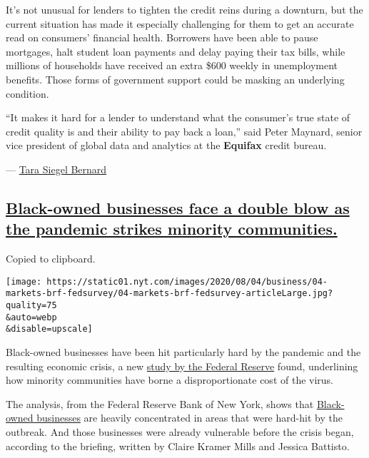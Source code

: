 It's not unusual for lenders to tighten the credit reins during a
downturn, but the current situation has made it especially challenging
for them to get an accurate read on consumers' financial health.
Borrowers have been able to pause mortgages, halt student loan payments
and delay paying their tax bills, while millions of households have
received an extra \$600 weekly in unemployment benefits. Those forms of
government support could be masking an underlying condition.

``It makes it hard for a lender to understand what the consumer's true
state of credit quality is and their ability to pay back a loan,'' said
Peter Maynard, senior vice president of global data and analytics at the
\textbf{Equifax} credit bureau.

--- \href{https://www.nytimes.com/by/tara-siegel-bernard}{Tara Siegel
Bernard}

\hypertarget{black-owned-businesses-face-a-double-blow-as-the-pandemic-strikes-minority-communities}{%
\subsection{\texorpdfstring{\protect\hyperlink{black-owned-businesses-face-a-double-blow-as-the-pandemic-strikes-minority-communities}{Black-owned
businesses face a double blow as the pandemic strikes minority
communities.}}{Black-owned businesses face a double blow as the pandemic strikes minority communities.}}\label{black-owned-businesses-face-a-double-blow-as-the-pandemic-strikes-minority-communities}}

Copied to clipboard.

\texttt{[image: https://static01.nyt.com/images/2020/08/04/business/04-markets-brf-fedsurvey/04-markets-brf-fedsurvey-articleLarge.jpg?quality=75\\\&auto=webp\\\&disable=upscale]}

Black-owned businesses have been hit particularly hard by the pandemic
and the resulting economic crisis, a new
\href{https://www.newyorkfed.org/smallbusiness/small-business-credit-survey-2020}{study
by the Federal Reserve} found, underlining how minority communities have
borne a disproportionate cost of the virus.

The analysis, from the Federal Reserve Bank of New York, shows that
\href{https://www.nytimes.com/interactive/2020/06/18/us/coronavirus-black-owned-small-business.html}{Black-owned
businesses} are heavily concentrated in areas that were hard-hit by the
outbreak. And those businesses were already vulnerable before the crisis
began, according to the briefing, written by Claire Kramer Mills and
Jessica Battisto.


